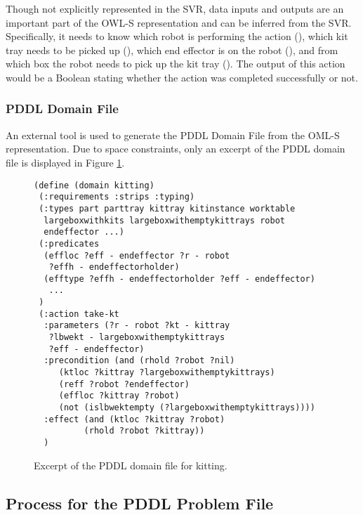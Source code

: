 Though not explicitly represented in the SVR, data inputs and outputs are an important part of the OWL-S representation and can be inferred from the SVR. Specifically, it needs to know which robot is performing the action (), which kit tray needs to be picked up (), which end effector is on the robot (), and from which box the robot needs to pick up the kit tray (). The output of this action would be a Boolean stating whether the action was completed successfully or not.

\subsubsection{PDDL Domain File}
An external tool is used to generate the PDDL Domain File from the OML-S representation. Due to space constraints, only an excerpt of the PDDL domain file is displayed in Figure \ref{fig:domainfile}.

\begin{figure}[h!]
\begin{center}
\begin{minipage}{.5\paperwidth}
\begin{mylisting}
\begin{Verbatim}[commandchars=\\\{\},commandchars=+\[\],fontsize=\scriptsize,numbersep=3pt]
(define (domain kitting)
 (:requirements :strips :typing)
 (:types part parttray kittray kitinstance worktable 
  largeboxwithkits largeboxwithemptykittrays robot 
  endeffector ...)
 (:predicates
  (effloc ?eff - endeffector ?r - robot 
   ?effh - endeffectorholder)
  (efftype ?effh - endeffectorholder ?eff - endeffector)
   ...
 )
 (:action take-kt
  :parameters (?r - robot ?kt - kittray
   ?lbwekt - largeboxwithemptykittrays
   ?eff - endeffector)
  :precondition (and (rhold ?robot ?nil)
     (ktloc ?kittray ?largeboxwithemptykittrays)
     (reff ?robot ?endeffector)
     (effloc ?kittray ?robot)
     (not (islbwektempty (?largeboxwithemptykittrays))))
  :effect (and (ktloc ?kittray ?robot)
          (rhold ?robot ?kittray))
  )
\end{Verbatim}
\end{mylisting}
\end{minipage}
\caption{Excerpt of the PDDL domain file for kitting.\label{fig:domainfile}}
\end{center}
\end{figure}

\subsection{Process for the PDDL Problem File}
\label{subsect:PDDL_Problem_File}
